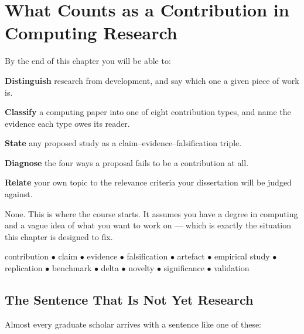 \chapter{What Counts as a Contribution in Computing Research}\label{ch:contribution}

\begin{outcomes}
By the end of this chapter you will be able to:
\begin{tight}
  \item \textbf{Distinguish} research from development, and say which one a
    given piece of work is.
  \item \textbf{Classify} a computing paper into one of eight contribution
    types, and name the evidence each type owes its reader.
  \item \textbf{State} any proposed study as a claim--evidence--falsification
    triple.
  \item \textbf{Diagnose} the four ways a proposal fails to be a contribution
    at all.
  \item \textbf{Relate} your own topic to the relevance criteria your
    dissertation will be judged against.
\end{tight}
\end{outcomes}

\begin{prereq}
None. This is where the course starts. It assumes you have a degree in
computing and a vague idea of what you want to work on --- which is exactly the
situation this chapter is designed to fix.
\end{prereq}

\begin{keyterms}
contribution $\bullet$ claim $\bullet$ evidence $\bullet$ falsification
$\bullet$ artefact $\bullet$ empirical study $\bullet$ replication
$\bullet$ benchmark $\bullet$ delta $\bullet$ novelty $\bullet$ significance
$\bullet$ validation
\end{keyterms}

\section{The Sentence That Is Not Yet Research}

Almost every graduate scholar arrives with a sentence like one of these:

